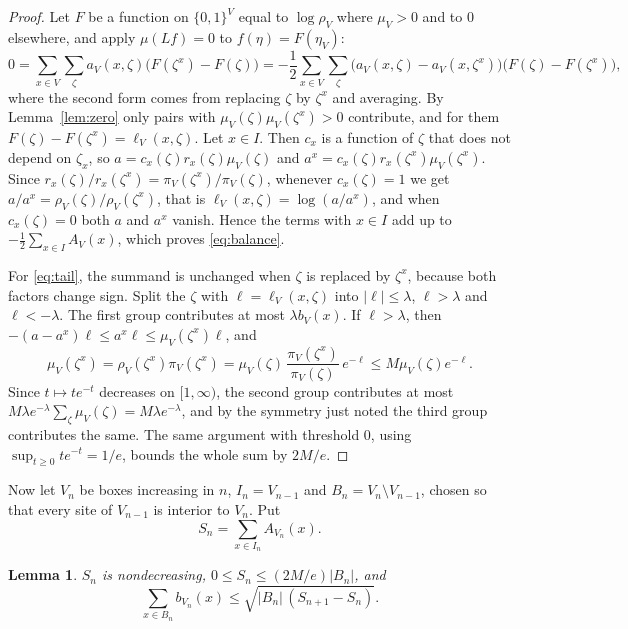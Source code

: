 \documentclass[11pt]{amsart}
\newtheorem{lemma}[theorem]{Lemma}
\theoremstyle{remark}
\begin{document}
\begin{proof}
Let $F$ be a function on $\{0,1\}^V$ equal to $\log\rho_V$ where $\mu_V>0$ and to $0$ elsewhere, and apply
$\mu(Lf)=0$ to $f(\eta)=F(\eta_V)$:
\[
0=\sum_{x\in V}\sum_\zeta a_V(x,\zeta)\bigl(F(\zeta^x)-F(\zeta)\bigr)
=-\frac12\sum_{x\in V}\sum_\zeta\bigl(a_V(x,\zeta)-a_V(x,\zeta^x)\bigr)\bigl(F(\zeta)-F(\zeta^x)\bigr),
\]
where the second form comes from replacing $\zeta$ by $\zeta^x$ and averaging. By Lemma~\ref{lem:zero} only pairs with
$\mu_V(\zeta)\mu_V(\zeta^x)>0$ contribute, and for them $F(\zeta)-F(\zeta^x)=\ell_V(x,\zeta)$. Let $x\in I$. Then
$c_x$ is a function of $\zeta$ that does not depend on $\zeta_x$, so $a=c_x(\zeta)r_x(\zeta)\mu_V(\zeta)$ and
$a^x=c_x(\zeta)r_x(\zeta^x)\mu_V(\zeta^x)$. Since $r_x(\zeta)/r_x(\zeta^x)=\pi_V(\zeta^x)/\pi_V(\zeta)$, whenever
$c_x(\zeta)=1$ we get $a/a^x=\rho_V(\zeta)/\rho_V(\zeta^x)$, that is $\ell_V(x,\zeta)=\log(a/a^x)$, and when
$c_x(\zeta)=0$ both $a$ and $a^x$ vanish. Hence the terms with $x\in I$ add up to $-\frac12\sum_{x\in I}A_V(x)$, which
proves \eqref{eq:balance}.

For \eqref{eq:tail}, the summand is unchanged when $\zeta$ is replaced by $\zeta^x$, because both factors change
sign. Split the $\zeta$ with $\ell=\ell_V(x,\zeta)$ into $|\ell|\le\lambda$, $\ell>\lambda$ and $\ell<-\lambda$. The
first group contributes at most $\lambda b_V(x)$. If $\ell>\lambda$, then $-(a-a^x)\ell\le a^x\ell\le\mu_V(\zeta^x)\ell$,
and
\[
\mu_V(\zeta^x)=\rho_V(\zeta^x)\pi_V(\zeta^x)=\mu_V(\zeta)\,\frac{\pi_V(\zeta^x)}{\pi_V(\zeta)}\,e^{-\ell}
\le M\mu_V(\zeta)e^{-\ell}.
\]
Since $t\mapsto te^{-t}$ decreases on $[1,\infty)$, the second group contributes at most
$M\lambda e^{-\lambda}\sum_\zeta\mu_V(\zeta)=M\lambda e^{-\lambda}$, and by the symmetry just noted the third
group contributes the same. The same argument with threshold $0$, using $\sup_{t\ge0}te^{-t}=1/e$, bounds the whole
sum by $2M/e$.
\end{proof}

Now let $V_n$ be boxes increasing in $n$, $I_n=V_{n-1}$ and $B_n=V_n\setminus V_{n-1}$, chosen so that every site of
$V_{n-1}$ is interior to $V_n$. Put
\[
S_n=\sum_{x\in I_n}A_{V_n}(x).
\]

\begin{lemma}\label{lem:shell}
$S_n$ is nondecreasing, $0\le S_n\le(2M/e)|B_n|$, and
\begin{equation}\label{eq:current}
\sum_{x\in B_n}b_{V_n}(x)\le\sqrt{|B_n|\,(S_{n+1}-S_n)} .
\end{equation}
\end{lemma}
\end{document}

